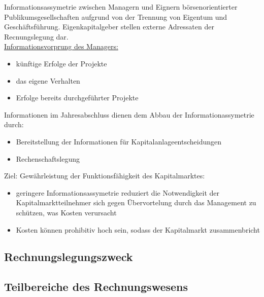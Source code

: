 \documentclass[paper=a4, fontsize=11pt]{scrartcl}
\numberwithin{equation}{section}
\numberwithin{figure}{section}
\numberwithin{table}{section}
\begin{document}
Informationsassymetrie zwischen Managern und Eignern börsenorientierter Publikumsgesellschaften aufgrund von der Trennung von Eigentum und Geschäftsführung.
Eigenkapitalgeber stellen externe Adressaten der Recnungslegung dar. \\

\underline{Informationsvorprung des Managers:}

\begin{itemize}
  \item künftige Erfolge der Projekte
  \item das eigene Verhalten
  \item Erfolge bereits durchgeführter Projekte
\end{itemize}

Informationen im Jahresabschluss dienen dem Abbau der Informationassymetrie durch:

\begin{itemize}
  \item Bereitstellung der Informationen für Kapitalanlageentscheidungen
  \item Rechenschaftslegung
\end{itemize}

Ziel: Gewährleistung der Funktionsfähigkeit des Kapitalmarktes:

\begin{itemize}
  \item geringere Informationsassymetrie reduziert die Notwendigkeit der Kapitalmarktteilnehmer
  sich gegen Übervortelung durch das Management zu schützen, was Kosten verursacht
  \item Kosten können prohibitiv hoch sein, sodass der Kapitalmarkt zusammenbricht
\end{itemize}


\subsection{Rechnungslegungszweck}


\subsection{Teilbereiche des Rechnungswesens}
\end{document}
